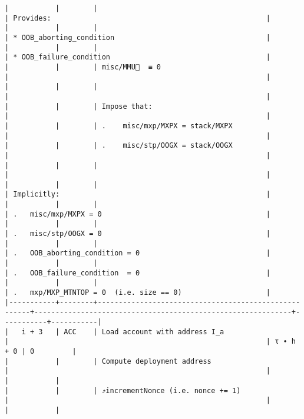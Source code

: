 \documentclass[varwidth=\maxdimen,margin=0.5cm,multi={verbatim}]{standalone}
\begin{document}
\begin{verbatim}
|           |        |                                                      | Provides:                                                   |
|           |        |                                                      | * OOB_aborting_condition                                    |
|           |        |                                                      | * OOB_failure_condition                                     |
|           |        | misc/MMU🚩  ≡ 0                                      |                                                             |
|           |        |                                                      |                                                             |
|           |        | Impose that:                                         |                                                             |
|           |        | .    misc/mxp/MXPX = stack/MXPX                      |                                                             |
|           |        | .    misc/stp/OOGX = stack/OOGX                      |                                                             |
|           |        |                                                      |                                                             |
|           |        |                                                      | Implicitly:                                                 |
|           |        |                                                      | .   misc/mxp/MXPX = 0                                       |
|           |        |                                                      | .   misc/stp/OOGX = 0                                       |
|           |        |                                                      | .   OOB_aborting_condition = 0                              |
|           |        |                                                      | .   OOB_failure_condition  = 0                              |
|           |        |                                                      | .   mxp/MXP_MTNTOP = 0  (i.e. size == 0)                    |
|-----------+--------+------------------------------------------------------+-------------------------------------------------------------+-----------+-----------|
|   i + 3   | ACC    | Load account with address I_a                        |                                                             | τ ∙ h + 0 | 0         |
|           |        | Compute deployment address                           |                                                             |           |           |
|           |        | ⤴️incrementNonce (i.e. nonce += 1)                   |                                                             |           |           |

\end{verbatim}
\end{document}
